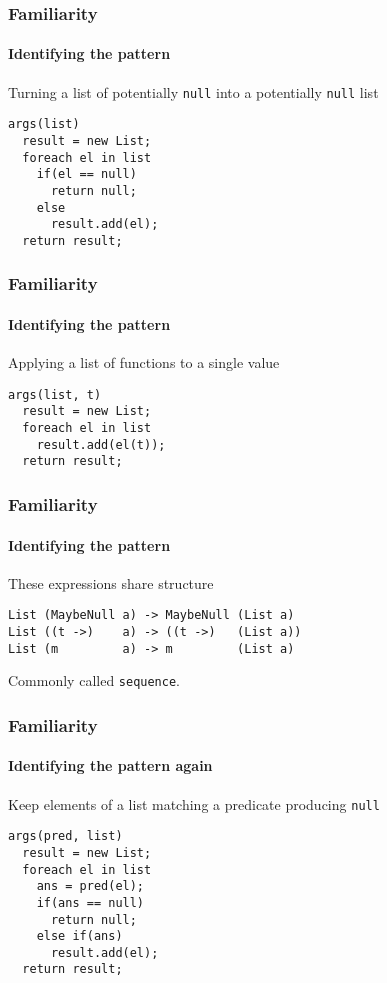 \begin{frame}[fragile]
\frametitle{Familiarity}
\framesubtitle{Identifying the pattern}
\begin{block}{Turning a list of potentially \lstinline{null} into a potentially \lstinline{null} list}
\begin{lstlisting}[style=language]
args(list)
  result = new List;
  foreach el in list
    if(el == null)
      return null;
    else
      result.add(el);
  return result;
\end{lstlisting}
\end{block}
\end{frame}

\begin{frame}[fragile]
\frametitle{Familiarity}
\framesubtitle{Identifying the pattern}
\begin{block}{Applying a list of functions to a single value}
\begin{lstlisting}[style=language]
args(list, t)
  result = new List;
  foreach el in list
    result.add(el(t));
  return result;
\end{lstlisting}
\end{block}
\end{frame}

\begin{frame}[fragile]
\frametitle{Familiarity}
\framesubtitle{Identifying the pattern}
\begin{block}{These expressions share structure}
\begin{lstlisting}[style=language]
List (MaybeNull a) -> MaybeNull (List a)
List ((t ->)    a) -> ((t ->)   (List a))
List (m         a) -> m         (List a)
\end{lstlisting}
\end{block}
Commonly called \lstinline{sequence}.
\end{frame}

\begin{frame}[fragile]
\frametitle{Familiarity}
\framesubtitle{Identifying the pattern again}
\begin{block}{Keep elements of a list matching a predicate producing \lstinline{null}}
\begin{lstlisting}[style=language]
args(pred, list)
  result = new List;
  foreach el in list
    ans = pred(el);
    if(ans == null)
      return null;
    else if(ans)
      result.add(el);
  return result;
\end{lstlisting}
\end{block}
\end{frame}

